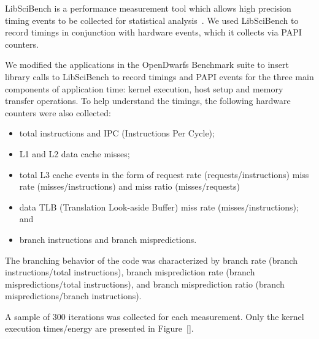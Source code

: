 \documentclass[../document.tex]{subfiles}
\begin{document}
\label{ssec:time}

LibSciBench is a performance measurement tool which allows high precision timing events to be collected for statistical analysis~\cite{hoefler2015scientific}.
We used LibSciBench to record timings in conjunction with hardware events, which it collects via PAPI~\cite{mucci1999papi} counters.

We modified the applications in the OpenDwarfs Benchmark suite to insert library calls to LibSciBench to record timings and PAPI events for the three main components of application time: kernel execution, host setup and memory transfer operations. 
To help understand the timings, the following hardware counters were also collected:
\begin{itemize}
	\item total instructions and IPC (Instructions Per Cycle);
	\item L1 and L2 data cache misses;
	\item total L3 cache events in the form of request rate (requests/instructions) miss rate (misses/instructions) and miss ratio (misses/requests)
	\item data TLB (Translation Look-aside Buffer) miss rate (misses/instructions); and
	\item branch instructions and branch mispredictions.
\end{itemize}
The branching behavior of the code was characterized by branch rate (branch instructions/total instructions), branch misprediction rate (branch mispredictions/total instructions), and
branch misprediction ratio (branch mispredictions/branch instructions).

A sample of 300 iterations was collected for each measurement.
Only the kernel execution times/energy are presented in Figure~\ref{}. 
\end{document}
